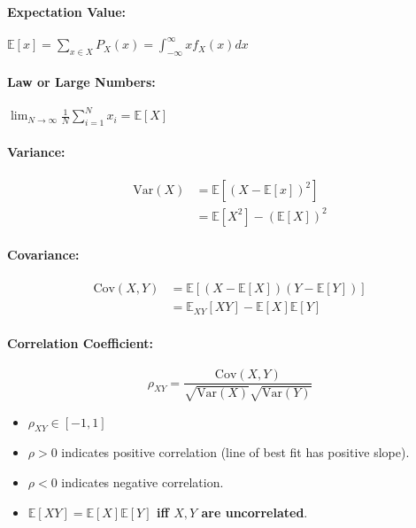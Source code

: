 \documentclass[a4paper,12pt]{report}
\begin{document}
\paragraph{Expectation Value: } $\mathbb E[x] = \sum_{x\in X}^{} P_X(x) = \int_{-\infty}^{\infty} xf_X(x) dx$

\paragraph{Law or Large Numbers: } $\lim_{N\to\infty} \frac{1}{N} \sum_{i=1}^{N} x_i = \mathbb E[X]$

\paragraph{Variance: } 

\begin{equation}
\begin{split}
\text{Var} (X) &= \mathbb E[(X-\mathbb E[x])^2] \\
&= \mathbb E[X^2] - (\mathbb E[X])^2
\end{split}
\end{equation}

\paragraph{Covariance: } 
\begin{equation}
\begin{split}
\text{Cov}(X,Y) &= \mathbb E[(X-\mathbb E[X]) (Y-\mathbb E[Y])] \\
&= \mathbb E_{XY}[XY] - \mathbb E[X]\mathbb E[Y]
\end{split}
\end{equation}

\paragraph{Correlation Coefficient: } 
\begin{equation}
\rho_{XY} = \frac{\text{Cov}(X,Y)}{\sqrt{\text{Var}(X)}\sqrt{\text{Var}(Y)}} 
\end{equation}
\begin{itemize}
\item $\rho_{XY}\in [-1, 1]$
\item $\rho > 0$ indicates positive correlation (line of best fit has positive slope).
\item $\rho < 0$ indicates negative correlation.
\item \textbf{$\mathbb E[XY] = \mathbb E[X] \mathbb E[Y]$ iff $X,Y$ are uncorrelated}.
\end{itemize}
\end{document}
